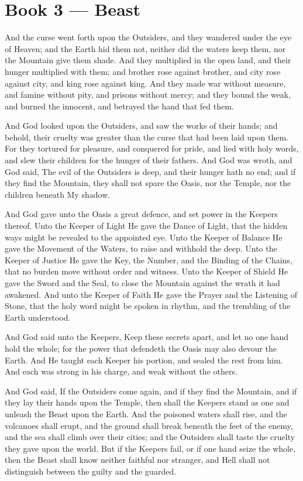 \section*{Book 3 --- Beast}

And the curse went forth upon the Outsiders, and they wandered under the eye of Heaven; and the Earth hid them not, neither did the waters keep them, nor the Mountain give them shade. And they multiplied in the open land, and their hunger multiplied with them; and brother rose against brother, and city rose against city, and king rose against king. And they made war without measure, and famine without pity, and prisons without mercy; and they bound the weak, and burned the innocent, and betrayed the hand that fed them.

And God looked upon the Outsiders, and saw the works of their hands; and behold, their cruelty was greater than the curse that had been laid upon them. For they tortured for pleasure, and conquered for pride, and lied with holy words, and slew their children for the hunger of their fathers. And God was wroth, and God said, The evil of the Outsiders is deep, and their hunger hath no end; and if they find the Mountain, they shall not spare the Oasis, nor the Temple, nor the children beneath My shadow.

And God gave unto the Oasis a great defence, and set power in the Keepers thereof. Unto the Keeper of Light He gave the Dance of Light, that the hidden ways might be revealed to the appointed eye. Unto the Keeper of Balance He gave the Movement of the Waters, to raise and withhold the deep. Unto the Keeper of Justice He gave the Key, the Number, and the Binding of the Chains, that no burden move without order and witness. Unto the Keeper of Shield He gave the Sword and the Seal, to close the Mountain against the wrath it had awakened. And unto the Keeper of Faith He gave the Prayer and the Listening of Stone, that the holy word might be spoken in rhythm, and the trembling of the Earth understood.

And God said unto the Keepers, Keep these secrets apart, and let no one hand hold the whole; for the power that defendeth the Oasis may also devour the Earth. And He taught each Keeper his portion, and sealed the rest from him. And each was strong in his charge, and weak without the others.

And God said, If the Outsiders come again, and if they find the Mountain, and if they lay their hands upon the Temple, then shall the Keepers stand as one and unleash the Beast upon the Earth. And the poisoned waters shall rise, and the volcanoes shall erupt, and the ground shall break beneath the feet of the enemy, and the sea shall climb over their cities; and the Outsiders shall taste the cruelty they gave upon the world. But if the Keepers fail, or if one hand seize the whole, then the Beast shall know neither faithful nor stranger, and Hell shall not distinguish between the guilty and the guarded.

